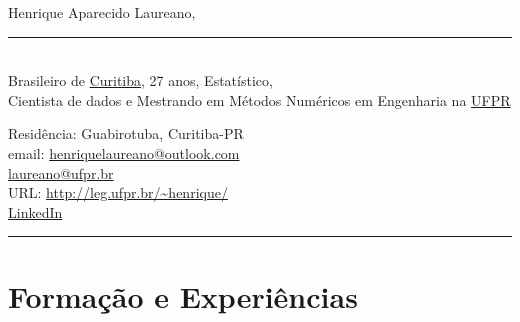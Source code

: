 \message{ !name(vitae.tex)}\documentclass[12pt]{article}
\newcommand{\horrule}[1]{\noindent\rule{\linewidth}{#1}}
\begin{document}


\noindent
\begin{minipage}[t]{.565\textwidth}
 \raggedright
 \large Henrique Aparecido Laureano,
 \noindent\rule{.89\linewidth}{1pt}\\
 \normalsize Brasileiro de
 \href{https://goo.gl/K1Qcdv}{\color{blue}Curitiba}, 27 anos,
 Estat\'{i}stico,\\Cientista de dados e Mestrando em M\'{e}todos
 Num\'{e}ricos em Engenharia na
 \href{https://goo.gl/DtVAbi}{\color{blue}UFPR}
\end{minipage}%
\begin{minipage}[t]{.435\textwidth}
 \raggedright
 Resid\^{e}ncia: Guabirotuba, Curitiba-PR\\
 email:
 \href{mailto:henriquelaureano@outlook.com}{\color{blue}henriquelaureano@outlook.com}\\
 \hspace{1.2cm}
 \href{mailto:laureano@ufpr.br}{\color{blue}laureano@ufpr.br}\\
 URL: \url{http://leg.ufpr.br/~henrique/}\\
 \href{https://www.linkedin.com/in/henrique-laureano-025328179}{\color{blue}LinkedIn}
\end{minipage}

\vspace{.5cm}
\horrule{1pt}

\section*{Forma\c{c}\~{a}o e Experi\^{e}ncias}
\end{document}
